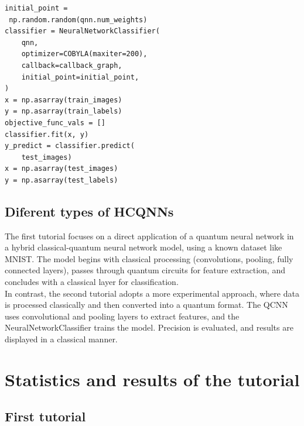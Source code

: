\documentclass[conference]{IEEEtran}
\begin{document}
\begin{itemize}
{\small
\begin{verbatim}
initial_point =
 np.random.random(qnn.num_weights)
classifier = NeuralNetworkClassifier(
    qnn,
    optimizer=COBYLA(maxiter=200),
    callback=callback_graph,
    initial_point=initial_point,
)
x = np.asarray(train_images)
y = np.asarray(train_labels)
objective_func_vals = []
classifier.fit(x, y)
y_predict = classifier.predict(
    test_images)
x = np.asarray(test_images)
y = np.asarray(test_labels)
\end{verbatim}}
\end{itemize}


\subsection*{\fontsize{16}{20}\selectfont Diferent types of HCQNNs}

\noindent
The first tutorial focuses on a direct application of a quantum neural network in a hybrid classical-quantum neural network model, 
using a known dataset like MNIST. The model begins with classical processing (convolutions, pooling, fully connected layers), 
passes through quantum circuits for feature extraction, and concludes with a classical layer for classification. \\
\noindent
In contrast, 
the second tutorial adopts a more experimental approach, where data is processed classically and then converted into a quantum format. 
The QCNN uses convolutional and pooling layers to extract features, and the NeuralNetworkClassifier trains the model. 
Precision is evaluated, and results are displayed in a classical manner. 

\section*{\fontsize{16}{20}\selectfont Statistics and results of the tutorial}

\subsection*{\fontsize{12}{16}\selectfont First tutorial}
\end{document}
